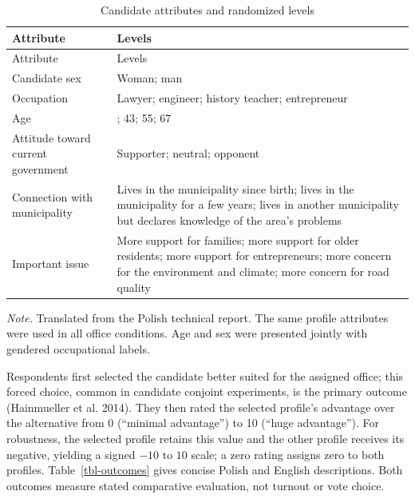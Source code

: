 \documentclass[
  letterpaper,
  DIV=11,
  numbers=noendperiod]{scrartcl}
\newcommand{\criticmarkupadd}[1]{#1}
\newcommand{\criticmarkuprm}[1]{}
\begin{document}
\begin{longtable}[]{@{}
  >{\raggedright\arraybackslash}p{}
  >{\raggedright\arraybackslash}p{}@{}}
\caption{Candidate attributes and randomized
levels}\label{tbl-attributes}\tabularnewline
\toprule\noalign{}
\begin{minipage}[b]{\linewidth}\raggedright
Attribute
\end{minipage} & \begin{minipage}[b]{\linewidth}\raggedright
Levels
\end{minipage} \\
\midrule\noalign{}
\endfirsthead
\toprule\noalign{}
\begin{minipage}[b]{\linewidth}\raggedright
Attribute
\end{minipage} & \begin{minipage}[b]{\linewidth}\raggedright
Levels
\end{minipage} \\
\midrule\noalign{}
\endhead
\bottomrule\noalign{}
\endlastfoot
Candidate sex & Woman; man \\
Occupation & Lawyer; engineer; history teacher; entrepreneur \\
Age & 31; 43; 55; 67 \\
Attitude toward current government & Supporter; neutral; opponent \\
Connection with municipality & Lives in the municipality since birth;
lives in the municipality for a few years; lives in another municipality
but declares knowledge of the area's problems \\
Important issue & More support for families; more support for older
residents; more support for entrepreneurs; more concern for the
environment and climate; more concern for road quality \\
\end{longtable}

\emph{Note.} Translated from the Polish technical report. The same
profile attributes were used in all office conditions. Age and sex were
presented jointly with gendered occupational labels.

Respondents first selected the candidate better suited for the assigned
office; this forced \criticmarkuprm{choice}\criticmarkupadd{choice,
common in candidate conjoint experiments,} is the primary
\criticmarkuprm{outcome.}\criticmarkupadd{outcome (Hainmueller et al.
2014).} They then rated the selected profile's advantage over the
alternative from 0 (``minimal advantage'') to 10 (``huge advantage'').
For robustness, the selected profile retains this value and the other
profile receives its negative, yielding a signed \(-10\) to \(10\)
\criticmarkuprm{scale.}\criticmarkupadd{scale; a zero rating assigns
zero to both profiles.} Table~\ref{tbl-outcomes} gives concise Polish
and English descriptions. Both outcomes measure stated comparative
evaluation, not turnout or vote choice.
\end{document}
